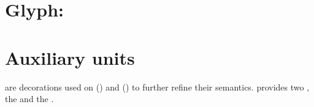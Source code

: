 %


\section{Glyph: }
\label{sec:annotation}




\section{Auxiliary units}\label{sec:aux}

 are decorations used on  () and  () to further refine their semantics.  \SBGNERLone{} provides two , the  and the .




